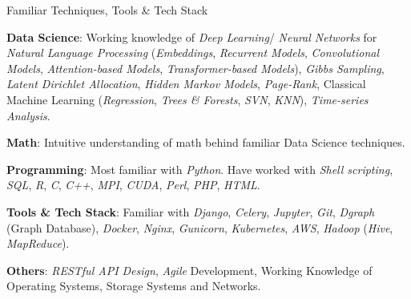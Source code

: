 \documentclass{resume} %
\begin{document}
\begin{rSection}{Familiar Techniques, Tools \& Tech Stack}

\begin{rTechExpertiseList}
\item {\bf Data Science}: Working knowledge of {\em Deep Learning}/ {\em Neural Networks} for {\em Natural Language Processing} ({\em Embeddings}, {\em Recurrent Models}, {\em Convolutional Models}, {\em Attention-based Models}, {\em Transformer-based Models}), {\em Gibbs Sampling}, {\em Latent Dirichlet Allocation}, {\em Hidden Markov Models}, {\em Page-Rank}, Classical Machine Learning ({\em Regression}, {\em Trees \& Forests}, {\em SVN}, {\em KNN}), {\em Time-series Analysis}.
\item{\bf Math}: Intuitive understanding of math behind familiar Data Science techniques.
\item {\bf Programming}: Most familiar with {\em Python}. Have worked with {\em Shell scripting}, {\em SQL}, {\em R}, {\em C}, {\em C++}, {\em MPI}, {\em CUDA}, {\em Perl}, {\em PHP}, {\em HTML}.
\item {\bf Tools \& Tech Stack}: Familiar with {\em Django}, {\em Celery}, {\em Jupyter}, {\em Git}, {\em Dgraph} (Graph Database), {\em Docker}, {\em Nginx}, {\em Gunicorn}, {\em Kubernetes}, {\em AWS}, {\em Hadoop} ({\em Hive}, {\em MapReduce}).
\item {\bf Others}: {\em RESTful API Design}, {\em Agile} Development, Working Knowledge of Operating Systems, Storage Systems and Networks.
\end{rTechExpertiseList}

\end{rSection}




   
\end{document}

